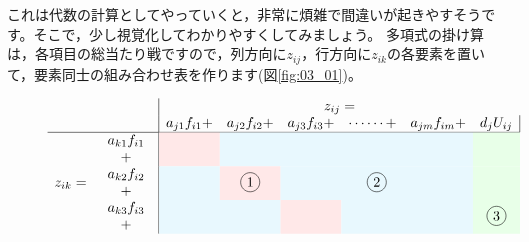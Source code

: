\documentclass{ltjsbook}
\begin{document}
これは代数の計算としてやっていくと，非常に煩雑で間違いが起きやすそうです。そこで，少し視覚化してわかりやすくしてみましょう。
多項式の掛け算は，各項目の総当たり戦ですので，列方向に$z_{ij}$，行方向に$z_{ik}$の各要素を置いて，要素同士の組み合わせ表を作ります(図\ref{fig:03_01})。

\begin{figure}[ht]
	\[
		\begin{array}{rl|cccccc|}
			        &                                                       & \multicolumn{6}{c}{z_{ij}=}                                                                                                                                                                                                                                        \\
			        &                                                       & a_{j1}f_{i1} +                                          & a_{j2}f_{i2}+                                            & a_{j3}f_{i3} +                                         & \cdots\cdots +                                          & a_{jm}f_{im} + & d_jU_{ij} \\\hline
			        & \begin{array}{c}a_{k1}f_{i1}\\+\end{array}            & \multicolumn{1}{>{\columncolor{red!9}}c}{}              & \multicolumn{4}{>{\columncolor{cyan!9}}c}{}              & \multicolumn{1}{>{\columncolor{green!9}}c}{}                                                                                                  \\
			z_{ik}= & \begin{array}{c}a_{k2}f_{i2}\\+\end{array}            & \multicolumn{1}{>{\columncolor{cyan!9}}c}{}             & \multicolumn{1}{>{\columncolor{red!9}}c}{\circled{1}}    & \multicolumn{3}{>{\columncolor{cyan!9}}c}{\circled{2}} & \multicolumn{1}{>{\columncolor{green!9}}c}{}                                         \\
			        & \begin{array}{c}a_{k3}f_{i3}\\+\end{array}            & \multicolumn{2}{>{\columncolor{cyan!9}}c}{}             & \multicolumn{1}{>{\columncolor{red!9}}c}{}               & \multicolumn{2}{>{\columncolor{cyan!9}}c}{}            & \multicolumn{1}{>{\columncolor{green!9}}c}{\circled{3}}                              \\

\end{array}\]
\end{figure}
\end{document}
